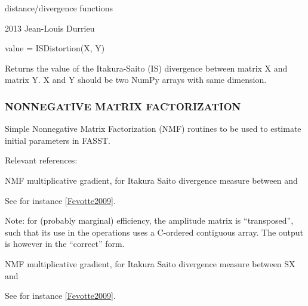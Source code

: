 \documentclass[letterpaper,10pt,english]{sphinxmanual}
\begin{document}
distance/divergence functions

2013 Jean-Louis Durrieu

\begin{fulllineitems}
\label{reference/tools:pyfasst.tools.distances.ISDistortion}
value = ISDistortion(X, Y)

Returns the value of the Itakura-Saito (IS) divergence between
matrix X and matrix Y. X and Y should be two NumPy arrays with
same dimension.

\end{fulllineitems}



\subsubsection{NONNEGATIVE MATRIX FACTORIZATION}
\label{reference/tools:module-pyfasst.tools.nmf}\label{reference/tools:nonnegative-matrix-factorization}
Simple Nonnegative Matrix Factorization (NMF) routines to be used
to estimate initial parameters in FASST.

Relevant references:

\begin{fulllineitems}
\label{reference/tools:pyfasst.tools.nmf.NMF_decomp_init}
NMF multiplicative gradient, for Itakura Saito
divergence measure between  and 

See for instance {\hyperref[reference/tools:fevotte2009]{{[}Fevotte2009{]}}}.

Note: for (probably marginal) efficiency, the amplitude matrix 
is ``transposed'', such that its use in the  operations uses
a C-ordered contiguous array. The output is however in the ``correct'' form.

\end{fulllineitems}


\begin{fulllineitems}
\label{reference/tools:pyfasst.tools.nmf.NMF_decomposition}
NMF multiplicative gradient, for Itakura Saito
divergence measure between SX and 

See for instance {\hyperref[reference/tools:fevotte2009]{{[}Fevotte2009{]}}}.

\end{fulllineitems}
\end{document}
